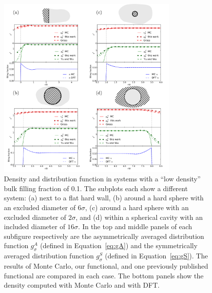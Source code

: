 \begin{figure}
  \begin{center}
    \noindent\includegraphics[width=0.8\textwidth]{figs/low-density}
  \end{center}
  \caption{Density and distribution function in
  systems with a ``low density'' bulk filling fraction of 0.1.  The
  subplots each show a different system: (a) next to a flat hard wall,
  (b) around a hard sphere with an excluded diameter of $6\sigma$, (c)
  around a hard sphere with an excluded diameter of $2\sigma$, and (d)
  within a spherical cavity with an included diameter of $16\sigma$.
  In the top and middle panels of each subfigure respectively are the
  asymmetrically averaged distribution function $g_\sigma^A$ (defined
  in Equation~\ref{eq:gA}) and the symmetrically averaged distribution
  function $g_\sigma^S$ (defined in Equation~\ref{eq:gS}).  The
  results of Monte Carlo, our functional, and one previously published
  functional\cite{gross2009density,
  yu2002fmt-dft-inhomogeneous-associating} are compared in each case.
  The bottom panels show the density computed with Monte Carlo and
  with DFT.}  \label{fig:low-density}
\end{figure}

